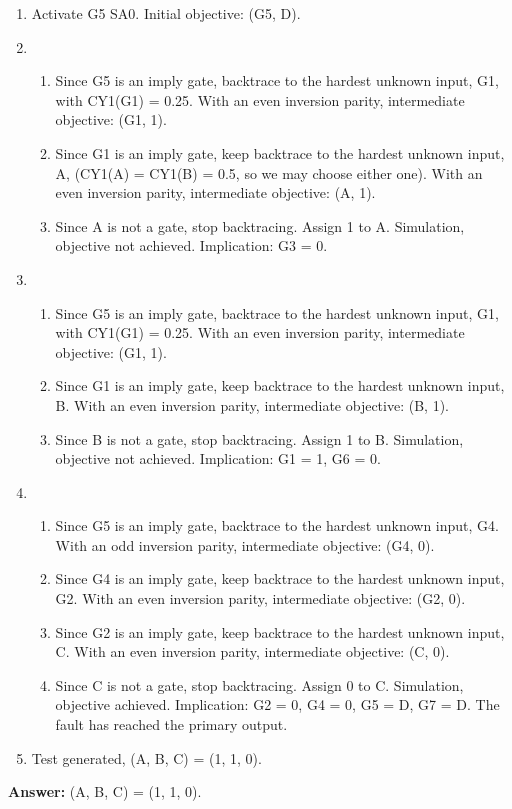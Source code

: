
\begin{enumerate}
  \item Activate G5 SA0. Initial objective: (G5, D).
  \item {
    \begin{enumerate}
      \item Since G5 is an imply gate, backtrace to the hardest unknown input, G1, with CY1(G1) = 0.25. With an even inversion parity, intermediate objective: (G1, 1).
      \item Since G1 is an imply gate, keep backtrace to the hardest unknown input, A, (CY1(A) = CY1(B) = 0.5, so we may choose either one). With an even inversion parity, intermediate objective: (A, 1).
      \item Since A is not a gate, stop backtracing. Assign 1 to A. Simulation, objective not achieved. Implication: G3 = 0.
    \end{enumerate}
  }
  \item {
    \begin{enumerate}
      \item Since G5 is an imply gate, backtrace to the hardest unknown input, G1, with CY1(G1) = 0.25. With an even inversion parity, intermediate objective: (G1, 1).
      \item Since G1 is an imply gate, keep backtrace to the hardest unknown input, B. With an even inversion parity, intermediate objective: (B, 1).
      \item Since B is not a gate, stop backtracing. Assign 1 to B. Simulation, objective not achieved. Implication: G1 = 1, G6 = 0.
    \end{enumerate}
  }
  \item {
    \begin{enumerate}
      \item Since G5 is an imply gate, backtrace to the hardest unknown input, G4. With an odd inversion parity, intermediate objective: (G4, 0).
      \item Since G4 is an imply gate, keep backtrace to the hardest unknown input, G2. With an even inversion parity, intermediate objective: (G2, 0).
      \item Since G2 is an imply gate, keep backtrace to the hardest unknown input, C. With an even inversion parity, intermediate objective: (C, 0).
      \item Since C is not a gate, stop backtracing. Assign 0 to C. Simulation, objective achieved. Implication: G2 = 0, G4 = 0, G5 = D, G7 = D. The fault has reached the primary output.
    \end{enumerate}
  }
  \item Test generated, (A, B, C) = (1, 1, 0).

\end{enumerate}

\textbf{Answer:} (A, B, C) = (1, 1, 0).

